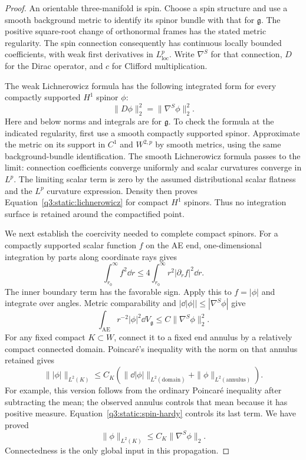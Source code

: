 \begin{proof}
An orientable three-manifold is spin.
Choose a spin structure and use a smooth background metric to
identify its spinor bundle with that for \(\mathfrak g\).
The positive square-root change of orthonormal frames has the
stated metric regularity.
The spin connection consequently has continuous locally bounded
coefficients, with weak first derivatives in \(L^p_{\mathrm{loc}}\).
Write \(\nabla^S\) for that connection, \(D\) for the Dirac operator,
and \(c\) for Clifford multiplication.

The weak Lichnerowicz formula has the following integrated form for
every compactly supported \(H^1\) spinor \(\phi\):
\begin{equation}
\label{q3:static:lichnerowicz}
\|D\phi\|_2^2=\|\nabla^S\phi\|_2^2.
\end{equation}
Here and below norms and integrals are for \(\mathfrak g\).
To check the formula at the indicated regularity, first use a smooth
compactly supported spinor. Approximate the metric on its support
in \(C^1\) and \(W^{2,p}\) by smooth metrics, using the same
background-bundle identification.
The smooth Lichnerowicz formula passes to the limit: connection
coefficients converge uniformly and scalar curvatures converge
in \(L^p\).
The limiting scalar term is zero by the assumed distributional
scalar flatness and the \(L^p\) curvature expression.
Density then proves Equation~\eqref{q3:static:lichnerowicz} for compact
\(H^1\) spinors.
Thus no integration surface is retained around the compactified point.

We next establish the coercivity needed to complete compact spinors.
For a compactly supported scalar function \(f\) on the AE end,
one-dimensional integration by parts along coordinate rays gives
\begin{equation}
\label{q3:static:radial-hardy}
\int_{r_0}^\infty f^2\dd r
\leq4\int_{r_0}^\infty r^2|\partial_rf|^2\dd r.
\end{equation}
The inner boundary term has the favorable sign.
Apply this to \(f=|\phi|\) and integrate over angles.
Metric comparability and
\(|\dd|\phi||\leq|\nabla^S\phi|\) give
\begin{equation}
\label{q3:static:spin-hardy}
\int_{\mathrm{AE}}r^{-2}|\phi|^2\dd V_{\mathfrak g}
\leq C\|\nabla^S\phi\|_2^2.
\end{equation}
For any fixed compact \(K\subset W\), connect it to a fixed end
annulus by a relatively compact connected domain.
Poincaré's inequality with the norm on that annulus retained gives
\[
\||\phi|\|_{L^2(K)}
\leq C_K\left(
\|\dd|\phi|\|_{L^2(\text{domain})}
 +\|\phi\|_{L^2(\text{annulus})}\right).
\]
For example, this version follows from the ordinary Poincaré
inequality after subtracting the mean; the observed annulus
controls that mean because it has positive measure.
Equation~\eqref{q3:static:spin-hardy} controls its last term.
We have proved
\begin{equation}
\label{q3:static:local-coercivity}
\|\phi\|_{L^2(K)}\leq C_K\|\nabla^S\phi\|_2.
\end{equation}
Connectedness is the only global input in this propagation.


\end{proof}
